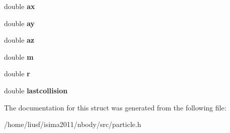 \begin{DoxyCompactItemize}
\item 
\hypertarget{structparticle_ab4aac66a4397decdeb9e444034a4e3ff}{
double {\bfseries ax}}
\label{structparticle_ab4aac66a4397decdeb9e444034a4e3ff}

\item 
\hypertarget{structparticle_a036303a295b667495c5b107fbb33a80e}{
double {\bfseries ay}}
\label{structparticle_a036303a295b667495c5b107fbb33a80e}

\item 
\hypertarget{structparticle_ae490dfd57d15896d6c16c289999d0b98}{
double {\bfseries az}}
\label{structparticle_ae490dfd57d15896d6c16c289999d0b98}

\item 
\hypertarget{structparticle_a4cb4f184e6cd2b5dc0dc555d14f265dd}{
double {\bfseries m}}
\label{structparticle_a4cb4f184e6cd2b5dc0dc555d14f265dd}

\item 
\hypertarget{structparticle_a9ba64d6fa0d4bda34688d54a05341b77}{
double {\bfseries r}}
\label{structparticle_a9ba64d6fa0d4bda34688d54a05341b77}

\item 
\hypertarget{structparticle_af266c2458f692078375791567c133b23}{
double {\bfseries lastcollision}}
\label{structparticle_af266c2458f692078375791567c133b23}

\end{DoxyCompactItemize}


The documentation for this struct was generated from the following file:\begin{DoxyCompactItemize}
\item 
/home/liusf/isima2011/nbody/src/particle.h\end{DoxyCompactItemize}
